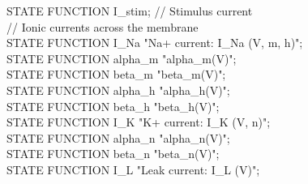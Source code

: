 \begin{maxipage}
\begin{example}
STATE FUNCTION I\_stim; // Stimulus current\\
// Ionic currents across the membrane \\
STATE FUNCTION I\_Na      "Na+ current:  I\_Na (V, m, h)";\\
STATE FUNCTION alpha\_m   "alpha\_m(V)";\\
STATE FUNCTION beta\_m    "beta\_m(V)";\\
STATE FUNCTION alpha\_h   "alpha\_h(V)";\\
STATE FUNCTION beta\_h    "beta\_h(V)";\\

STATE FUNCTION I\_K       "K+ current:   I\_K (V, n)";\\
STATE FUNCTION alpha\_n   "alpha\_n(V)";\\
STATE FUNCTION beta\_n    "beta\_n(V)";\\

STATE FUNCTION I\_L       "Leak current: I\_L (V)";\\

\end{example}
\end{maxipage}

